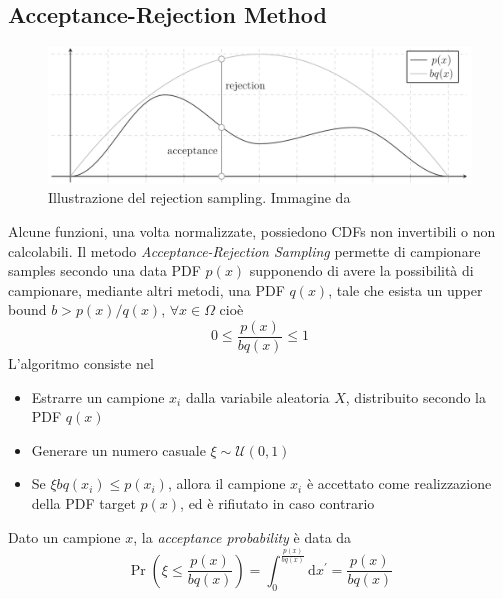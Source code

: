 \subsection{Acceptance-Rejection Method}
\begin{figure}[tb]
	\centering
	\includegraphics[width=0.8\linewidth]{../assets/chapter6_sampling_acceptance_rejection.png}
	\caption{Illustrazione del rejection sampling. Immagine da \cite{pegoraro}}
	\label{chapter6:sampling:rejectionSampling}
\end{figure}
Alcune funzioni, una volta normalizzate\footnotemark{}, possiedono CDFs non invertibili o non calcolabili. Il metodo 
\textit{Acceptance-Rejection Sampling} permette di campionare samples secondo una data PDF $p(x)$ supponendo di avere la possibilit\`a di campionare, 
mediante altri metodi, una PDF $q(x)$, tale che esista un upper bound $b>p(x)/q(x)$, $\forall x\in\Omega$ cio\`e
\begin{equation}
	0\leq\frac{p(x)}{bq(x)}\leq 1
\end{equation}
L'algoritmo consiste nel
\begin{itemize}[topsep=0pt,noitemsep]
	\item Estrarre un campione $x_i$ dalla variabile aleatoria $X$, distribuito secondo la PDF $q(x)$
	\item Generare un numero casuale $\xi\sim\mathcal{U}(0,1)$
	\item Se $\xi bq(x_i)\leq p(x_i)$, allora il campione $x_i$ \`e accettato come realizzazione della PDF target $p(x)$, ed \`e rifiutato in caso
		contrario
\end{itemize}
Dato un campione $x$, la \textit{acceptance probability} \`e data da
\begin{equation}
	\Pr\left(\xi\leq\frac{p(x)}{bq(x)}\right)=\int_0^{\frac{p(x)}{bq(x)}}\mathrm{d}x^\prime=\frac{p(x)}{bq(x)}
\end{equation}
